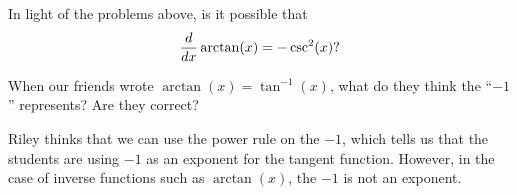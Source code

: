 \documentclass{ximera}
\begin{document}
\begin{problem}
In light of the problems above, is it possible that
\[
\frac{d}{dx} \arctan(x) = -\csc^2(x)?
\]
\begin{multipleChoice}
\end{multipleChoice}
\end{problem}

\begin{problem}
	When our friends wrote $\arctan(x) = \tan^{-1}(x)$, what do they think the ``$-1$'' represents?  Are they correct?
	\begin{freeResponse}
		Riley thinks that we can use the power rule on the $-1$, which tells us that the students are using $-1$ as an exponent for the tangent function.  However, in the case of inverse functions such as $\arctan(x)$, the $-1$ is not an exponent.
	\end{freeResponse}
\end{problem}






\end{document}
